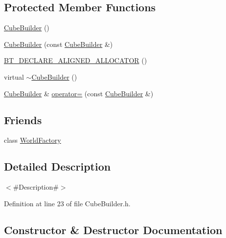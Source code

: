 \subsection*{Protected Member Functions}
\begin{DoxyCompactItemize}
\item 
\mbox{\hyperlink{classnjli_1_1_cube_builder_abe2c3fbf59c9e98e0f147d1524e9d97a}{Cube\+Builder}} ()
\item 
\mbox{\hyperlink{classnjli_1_1_cube_builder_a880e39d83c906cb15e3dfba742d6d1e4}{Cube\+Builder}} (const \mbox{\hyperlink{classnjli_1_1_cube_builder}{Cube\+Builder}} \&)
\item 
\mbox{\hyperlink{classnjli_1_1_cube_builder_a66faeead20453a4a696a370299f6f1f9}{B\+T\+\_\+\+D\+E\+C\+L\+A\+R\+E\+\_\+\+A\+L\+I\+G\+N\+E\+D\+\_\+\+A\+L\+L\+O\+C\+A\+T\+OR}} ()
\item 
virtual \mbox{\hyperlink{classnjli_1_1_cube_builder_a56a689a3cea2616a04854897aff0b98a}{$\sim$\+Cube\+Builder}} ()
\item 
\mbox{\hyperlink{classnjli_1_1_cube_builder}{Cube\+Builder}} \& \mbox{\hyperlink{classnjli_1_1_cube_builder_a5599555bddabaf1d20bfb71cc0e4ed40}{operator=}} (const \mbox{\hyperlink{classnjli_1_1_cube_builder}{Cube\+Builder}} \&)
\end{DoxyCompactItemize}
\subsection*{Friends}
\begin{DoxyCompactItemize}
\item 
class \mbox{\hyperlink{classnjli_1_1_cube_builder_acb96ebb09abe8f2a37a915a842babfac}{World\+Factory}}
\end{DoxyCompactItemize}


\subsection{Detailed Description}
$<$\#\+Description\#$>$ 

Definition at line 23 of file Cube\+Builder.\+h.



\subsection{Constructor \& Destructor Documentation}
\mbox{\label{classnjli_1_1_cube_builder_abe2c3fbf59c9e98e0f147d1524e9d97a}} 
